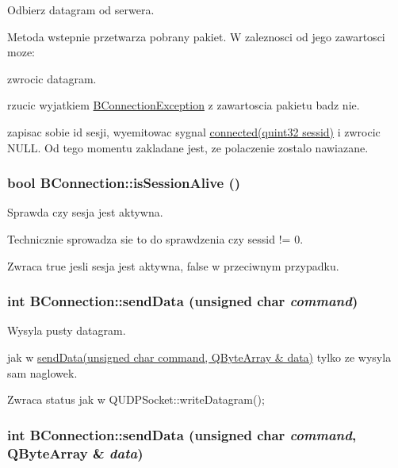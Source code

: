 Odbierz datagram od serwera. 

Metoda wstepnie przetwarza pobrany pakiet. W zaleznosci od jego zawartosci moze: \begin{DoxyItemize}
\item zwrocic datagram. \item rzucic wyjatkiem \hyperlink{class_b_connection_exception}{BConnectionException} z zawartoscia pakietu badz nie. \item zapisac sobie id sesji, wyemitowac sygnal \hyperlink{class_b_connection_a90dca3f0343427e31bb4544a8accf56d}{connected(quint32 sessid)} i zwrocic NULL. Od tego momentu zakladane jest, ze polaczenie zostalo nawiazane. \end{DoxyItemize}
\hypertarget{class_b_connection_a5a4985b2a3f559b448ce6660ba353acb}{
\subsubsection[{isSessionAlive}]{\setlength{\rightskip}{0pt plus 5cm}bool BConnection::isSessionAlive ()}}
\label{class_b_connection_a5a4985b2a3f559b448ce6660ba353acb}


Sprawda czy sesja jest aktywna. 

Technicznie sprowadza sie to do sprawdzenia czy sessid != 0.

\begin{DoxyReturn}{Zwraca}
true jesli sesja jest aktywna, false w przeciwnym przypadku. 
\end{DoxyReturn}
\hypertarget{class_b_connection_ae6e720ac6a03bd3672ab440eb1e9b8c5}{
\subsubsection[{sendData}]{\setlength{\rightskip}{0pt plus 5cm}int BConnection::sendData (unsigned char {\em command})}}
\label{class_b_connection_ae6e720ac6a03bd3672ab440eb1e9b8c5}


Wysyla pusty datagram. 

jak w \hyperlink{class_b_connection_a77f411c1ec683bd571f41023609f2e7f}{sendData(unsigned char command, QByteArray \& data)} tylko ze wysyla sam naglowek.

\begin{DoxyReturn}{Zwraca}
status jak w QUDPSocket::writeDatagram(); 
\end{DoxyReturn}
\hypertarget{class_b_connection_a77f411c1ec683bd571f41023609f2e7f}{
\subsubsection[{sendData}]{\setlength{\rightskip}{0pt plus 5cm}int BConnection::sendData (unsigned char {\em command}, \/  QByteArray \& {\em data})}}
\label{class_b_connection_a77f411c1ec683bd571f41023609f2e7f}


